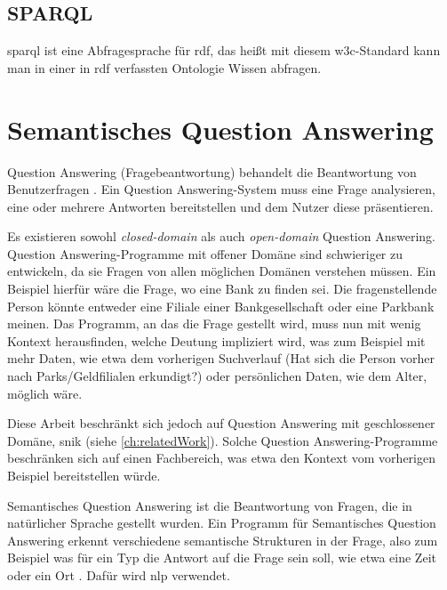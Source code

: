 \subsection{SPARQL}

\ac{sparql} ist eine Abfragesprache für \ac{rdf}, das heißt mit diesem \ac{w3c}-Standard kann man in einer in \ac{rdf} verfassten Ontologie Wissen abfragen.
\section{Semantisches Question Answering}

\begin{definition}
Question Answering (Fragebeantwortung) behandelt die Beantwortung von Benutzerfragen \citep{qadefinition}.
Ein Question Answering-System muss eine Frage analysieren, eine oder mehrere Antworten bereitstellen und dem Nutzer diese präsentieren.
\end{definition}

Es existieren sowohl \emph{closed-domain} als auch \emph{open-domain} Question Answering.
Question Answering-Programme mit offener Domäne sind schwieriger zu entwickeln,
da sie Fragen von allen möglichen Domänen verstehen müssen.
Ein Beispiel hierfür wäre die Frage, wo eine Bank zu finden sei.
Die fragenstellende Person könnte entweder eine Filiale einer Bankgesellschaft oder eine Parkbank meinen.
Das Programm, an das die Frage gestellt wird, muss nun mit wenig Kontext herausfinden,
welche Deutung impliziert wird, was zum Beispiel mit mehr Daten,
wie etwa dem vorherigen Suchverlauf (Hat sich die Person vorher nach Parks/Geldfilialen erkundigt?)
oder persönlichen Daten, wie dem Alter, möglich wäre.

Diese Arbeit beschränkt sich jedoch auf Question Answering mit geschlossener Domäne, \ac{snik} (siehe \cref{ch:relatedWork}).
Solche Question Answering-Programme beschränken sich auf einen Fachbereich,
was etwa den Kontext vom vorherigen Beispiel bereitstellen würde.

\begin{definition}
Semantisches Question Answering ist die Beantwortung von Fragen, die in natürlicher Sprache gestellt wurden.
Ein Programm für Semantisches Question Answering erkennt verschiedene semantische Strukturen in der Frage,
also zum Beispiel was für ein Typ die Antwort auf die Frage sein soll, wie etwa eine Zeit oder ein Ort \citep{sqadefinition}.
Dafür wird \acs{nlp} verwendet.
\end{definition}

